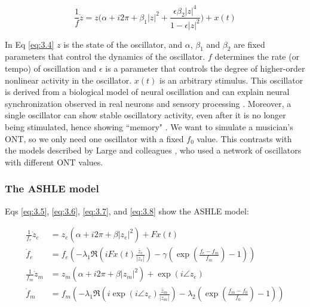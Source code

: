 \documentclass{report}
\begin{document}
\begin{equation}
\frac{1}{f}\dot{z} = z\bigg(\alpha + i2\pi + \beta_1|z|^2 + \frac{\epsilon\beta_2|z|^4}{1-\epsilon|z|^2}\bigg) + x(t) \label{eq:3.4}
\end{equation}

In Eq \eqref{eq:3.4} $z$ is the state of the oscillator, and $\alpha$, $\beta_1$ and $\beta_2$ are fixed parameters that control the dynamics of the oscillator. $f$ determines the rate (or tempo) of oscillation and $\epsilon$ is a parameter that controls the degree of higher-order nonlinear activity in the oscillator. $x(t)$ is an arbitrary stimulus. This oscillator is derived from a biological model of neural oscillation and can explain neural synchronization observed in real neurons and sensory processing \cite{lerud2019canonical, tal2017neural}. Moreover, a single oscillator can show stable oscillatory activity, even after it is no longer being stimulated, hence showing ``memory" \cite{kim2015signal}. We want to simulate a musician's ONT, so we only need one oscillator with a fixed $f_0$ value. This contrasts with the models described by Large and colleagues \cite{large2010canonical}, who used a network of oscillators with different ONT values.

\subsubsection{The ASHLE model}

Eqs \eqref{eq:3.5}, \eqref{eq:3.6}, \eqref{eq:3.7}, and \eqref{eq:3.8} show the ASHLE model:

\begin{subequations}
\begin{align}
\frac{1}{f_e}\dot{z}_e &= z_e\left( \alpha + i2\pi + \beta|z_e|^2 \right) + Fx(t) \label{eq:3.5} \\
\dot{f}_e &= f_e \left(-\lambda_1\Re\left( iFx(t)\frac{\bar{z}_e}{|z_e|} \right) - \gamma\left( \exp\left(\frac{f_e-f_m}{f_m}\right)-1 \right) \right) \label{eq:3.6} \\
\frac{1}{f_m}\dot{z}_m &= z_m \left( \alpha + i2\pi + \beta|z_m|^2 \right) + \exp(i \angle z_e) \label{eq:3.7} \\
\dot{f}_m &= f_m \left( -\lambda_1\Re \left( i\exp(i \angle z_e)\frac{\bar{z}_m}{|z_m|} \right) - \lambda_2 \left( \exp\left(\frac{f_m-f_0}{f_0}\right)-1 \right) \right) \label{eq:3.8}
\end{align}
\end{subequations}
\end{document}
